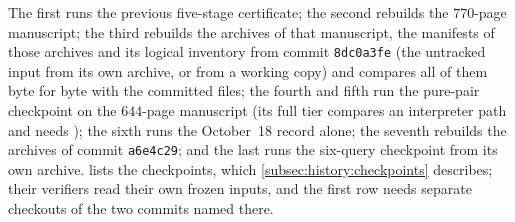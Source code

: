 The first runs the previous five-stage certificate; the second
rebuilds the $770$-page manuscript; the third rebuilds the
archives of that manuscript, the manifests of those archives and
its logical inventory from commit \texttt{8dc0a3fe} (the untracked
input from its own archive, or from a working copy) and compares
all of them byte for byte with the committed files; the fourth and fifth run the pure-pair checkpoint
on the $644$-page manuscript (its full tier compares an interpreter path and
needs ); the sixth runs the October~18 record alone; the
seventh rebuilds the archives of commit \texttt{a6e4c29}; and the last runs the
six-query checkpoint from its own archive.  lists the
checkpoints, which \cref{subsec:history:checkpoints} describes; their verifiers
read their own frozen inputs, and the first row needs separate checkouts of the
two commits named there.

